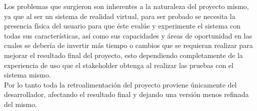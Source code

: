 Los problemas que surgieron son inherentes a la naturaleza del proyecto mismo, ya que al ser un sistema de realidad virtual, para ser probado se necesita la presencia física del usuario para que éste evalúe y experimente el sistema con todas sus características, así como sus capacidades y áreas de oportunidad en las cuales se debería de invertir más tiempo o cambios que se requieran realizar para mejorar el resultado final del proyecto, esto dependiendo completamente de la experiencia  de uso que el stakeholder obtenga al realizar las pruebas con el sistema mismo.\\

Por lo tanto toda la retroalimentación del proyecto proviene únicamente del desarrollador, afectando el resultado final y dejando una versión menos refinada del mismo.\\



